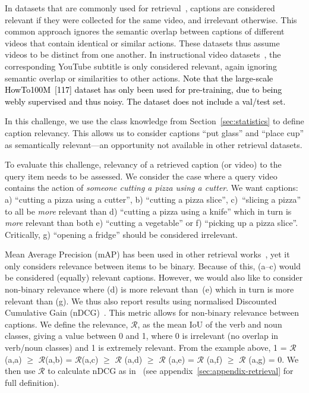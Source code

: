 \documentclass[twocolumn]{svjour3}          \smartqed
\newcommand{\chParagraph}[1]{\noindent {\textbf{#1.}} \hspace{6pt}}
\newcommand{\edits}[1]{\textcolor{black}{#1}}
\begin{document}
\chParagraph{Related Datasets}
In datasets that are commonly used for retrieval~\cite{xu2016msr,rohrbach2015dataset,zhou2017procnets,chen2011collecting}, 
captions are considered relevant if they were collected for the same video, and irrelevant otherwise. This common approach ignores the semantic overlap between captions of different videos that contain identical or similar actions. 
These datasets thus assume videos to be distinct from one another.
In instructional video datasets~\cite{zhou2017procnets,miech2019howto100m}, the corresponding YouTube subtitle is only considered relevant, again ignoring semantic overlap or similarities to other actions. \edits{Note that the large-scale HowTo100M~[117] dataset has only been used for pre-training, due to being webly supervised and thus noisy. The dataset does not include a val/test set.}

In this challenge, we use the class knowledge from Section~\ref{sec:statistics} to define caption relevancy. 
This allows us to consider captions ``put glass'' and ``place cup'' as semantically relevant---an opportunity not available in other retrieval datasets.

\chParagraph{Evaluation Metrics}
To evaluate this challenge, relevancy of a retrieved caption (or video) to the query item needs to be assessed.
We consider the case where a query video contains the action of \emph{someone cutting a pizza using a cutter}.
We want captions: a) ``cutting a pizza using a cutter'', b) ``cutting a pizza slice'', c)~``slicing a pizza'' to all be \textit{more} relevant than d) ``cutting a pizza using a knife'' which in turn is \textit{more} relevant than both e) ``cutting a vegetable'' or f) ``picking up a pizza slice''.
Critically, g) ``opening a fridge'' should be considered irrelevant.


Mean Average Precision (mAP) has been used in other retrieval works~\cite{wray2019fine,rasiwasia2014cluster,kang2015learning,cao2016correlation}, yet it only considers relevance between items to be binary.
Because of this, (a--c) would be considered (equally) relevant captions.
However, we would also like to consider non-binary relevance where (d) is more relevant than~(e) which in turn is more relevant than (g).
We thus also report results using normalised Discounted Cumulative Gain (nDCG)~\cite{jarvelin2002cumulated}. This metric allows for non-binary relevance between captions.
We define the relevance, $\mathcal{R}$, as the mean IoU of the verb and noun classes, giving a value between 0 and 1, where 0 is irrelevant (no overlap in verb/noun classes) and 1 is extremely relevant.
From the example above, 1 = $\mathcal{R}$(a,a) $\ge$ $\mathcal{R}$(a,b) = $\mathcal{R}$(a,c) $\ge$ $\mathcal{R}$ (a,d) $\ge$ $\mathcal{R}$ (a,e) = $\mathcal{R}$ (a,f) $\ge$ $\mathcal{R}$ (a,g) = 0.
We then use $\mathcal{R}$ to calculate nDCG as in~\cite{jarvelin2002cumulated} (see appendix~\ref{sec:appendix-retrieval} for full definition).
\end{document}
